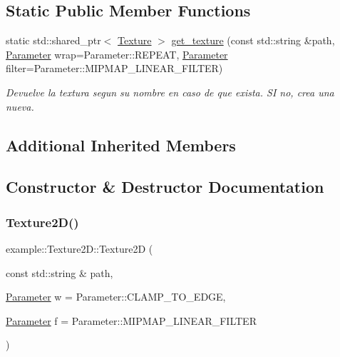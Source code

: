 \subsection*{Static Public Member Functions}
\begin{DoxyCompactItemize}
\item 
static std\+::shared\+\_\+ptr$<$ \mbox{\hyperlink{classexample_1_1_texture}{Texture}} $>$ \mbox{\hyperlink{classexample_1_1_texture2_d_a85fa0256a1d1f2e1a2770fc631deee02}{get\+\_\+texture}} (const std\+::string \&path, \mbox{\hyperlink{classexample_1_1_texture_a4f7233e69c4a5b913dbe53d729c1765f}{Parameter}} wrap=Parameter\+::\+R\+E\+P\+E\+AT, \mbox{\hyperlink{classexample_1_1_texture_a4f7233e69c4a5b913dbe53d729c1765f}{Parameter}} filter=Parameter\+::\+M\+I\+P\+M\+A\+P\+\_\+\+L\+I\+N\+E\+A\+R\+\_\+\+F\+I\+L\+T\+ER)
\begin{DoxyCompactList}\small\item\em Devuelve la textura segun su nombre en caso de que exista. SI no, crea una nueva. \end{DoxyCompactList}\end{DoxyCompactItemize}
\subsection*{Additional Inherited Members}


\subsection{Constructor \& Destructor Documentation}
\mbox{\label{classexample_1_1_texture2_d_ad23ba32ac7e93532c2b794eb71593bfd}} 
\subsubsection{\texorpdfstring{Texture2D()}{Texture2D()}}
{\footnotesize\ttfamily example\+::\+Texture2\+D\+::\+Texture2D (\begin{DoxyParamCaption}\item[{const std\+::string \&}]{path,  }\item[{\mbox{\hyperlink{classexample_1_1_texture_a4f7233e69c4a5b913dbe53d729c1765f}{Parameter}}}]{w = {\ttfamily Parameter\+:\+:CLAMP\+\_\+TO\+\_\+EDGE},  }\item[{\mbox{\hyperlink{classexample_1_1_texture_a4f7233e69c4a5b913dbe53d729c1765f}{Parameter}}}]{f = {\ttfamily Parameter\+:\+:MIPMAP\+\_\+LINEAR\+\_\+FILTER} }\end{DoxyParamCaption})\hspace{0.3cm}{\ttfamily [inline]}}



